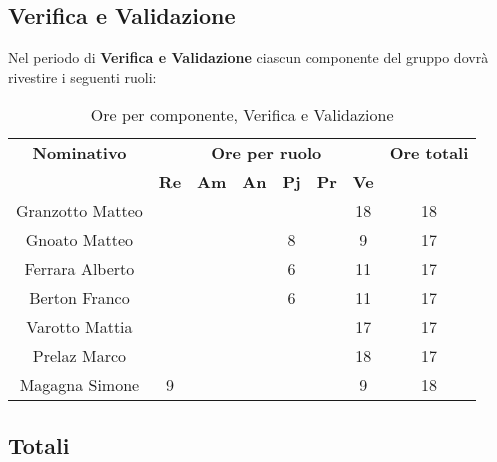 \subsection{Verifica e Validazione}
Nel periodo di \textbf{Verifica e Validazione} ciascun componente del gruppo dovrà rivestire i seguenti ruoli:
\begin{table}[H]
	\begin{center}
		\begin{tabular}{|c|c|c|c|c|c|c|c|}
			\hline
			\textbf{Nominativo} & \multicolumn{6}{c|}{\textbf{Ore per ruolo}} & \textbf{Ore totali} \\
			& \textbf{Re} & \textbf{Am} & \textbf{An} & \textbf{Pj} & \textbf{Pr} & \textbf{Ve} & \\
			\hline
			Granzotto Matteo	&		&	 	&		&		&	 	& 	18	&	18	\\
			\hline
			Gnoato Matteo		&		&		&		&	8	&		&	9	&	17	\\
			\hline
			Ferrara Alberto		&		&		&		&	 6	&		&	11	& 	17	\\
			\hline
			Berton Franco		&		&		&		&	6	&		&	11	&	17	\\
			\hline
			Varotto Mattia 		&		&		&		&		&		&	17	& 	17	\\
			\hline
			Prelaz Marco 		& 		&		&		&		&		&	18	&	17	\\
			\hline
			Magagna Simone 		&	9	&		&		&		&		& 	9	&	18	\\
			\hline
		\end{tabular}
	\end{center}
	\caption{Ore per componente, Verifica e Validazione}
\end{table}
\subsection{Totali}
